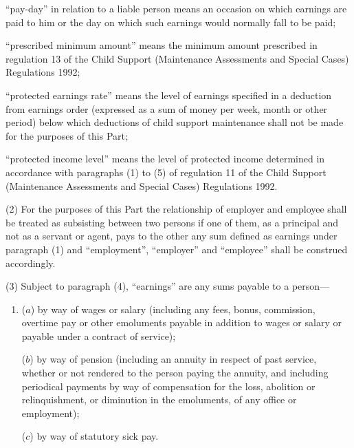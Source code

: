 \documentclass[12pt,a4paper]{article}
\begin{document}
\begin{enumerate}
“pay-day” in relation to a liable person means an occasion on which earnings are paid to him or the day on which such earnings would normally fall to be paid;

“prescribed minimum amount” means the minimum amount prescribed in regulation 13 of the Child Support (Maintenance Assessments and Special Cases) Regulations 1992;

“protected earnings rate” means the level of earnings specified in a deduction from earnings order (expressed as a sum of money per week, month or other period) below which deductions of child support maintenance shall not be made for the purposes of this Part;

“protected income level” means the level of protected income determined in accordance with 
paragraphs (1) to (5) of  %
regulation 11 of the Child Support (Maintenance Assessments and Special Cases) Regulations 1992.
\end{enumerate}

(2) For the purposes of this Part the relationship of employer and employee shall be treated as subsisting between two persons if one of them, as a principal and not as a servant or agent, pays to the other any sum defined as earnings under paragraph (1) and “employment”, “employer” and “employee” shall be construed accordingly.

(3) Subject to paragraph (4), “earnings” are any sums payable to a person—
\begin{enumerate}\item[]
($a$) by way of wages or salary (including any fees, bonus, commission, overtime pay or other emoluments payable in addition to wages or salary or payable under a contract of service);

($b$) by way of pension (including an annuity in respect of past service, whether or not rendered to the person paying the annuity, and including periodical payments by way of compensation for the loss, abolition or relinquishment, or diminution in the emoluments, of any office or employment);

($c$) by way of statutory sick pay.
\end{enumerate}
\end{document}

